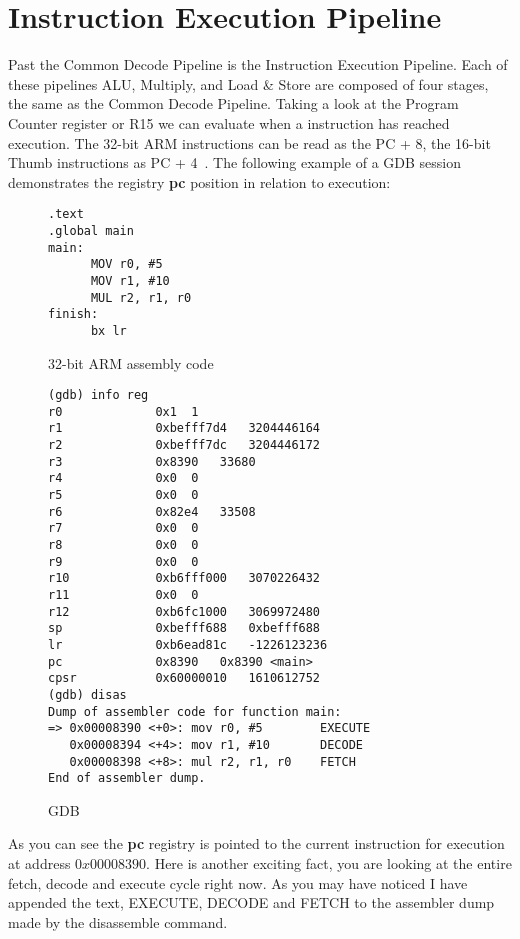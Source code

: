 \documentclass[11pt]{report}
\begin{document}
\section{Instruction Execution Pipeline }
\begin{onehalfspace}
Past the Common Decode Pipeline is the Instruction Execution Pipeline. Each of these pipelines ALU, Multiply, and Load \& Store are composed of four stages, the same as the Common Decode Pipeline. Taking a look at the Program Counter register or R15 we can evaluate when a instruction has reached execution. The 32-bit ARM instructions can be read as the PC + 8, the 16-bit Thumb instructions as PC + 4~\citep[A2-11]{arm7}. The following example of a GDB session demonstrates the registry \textbf{pc} position in relation to execution:
\end{onehalfspace}
\begin{figure}[H]
\begin{verbatim}
.text
.global main
main:
      MOV r0, #5
      MOV r1, #10
      MUL r2, r1, r0
finish:
      bx lr
\end{verbatim}
\caption{32-bit ARM assembly code}
\end{figure}
\begin{figure}[H]
\begin{verbatim}
(gdb) info reg
r0             0x1	1
r1             0xbefff7d4	3204446164
r2             0xbefff7dc	3204446172
r3             0x8390	33680
r4             0x0	0
r5             0x0	0
r6             0x82e4	33508
r7             0x0	0
r8             0x0	0
r9             0x0	0
r10            0xb6fff000	3070226432
r11            0x0	0
r12            0xb6fc1000	3069972480
sp             0xbefff688	0xbefff688
lr             0xb6ead81c	-1226123236
pc             0x8390	0x8390 <main>
cpsr           0x60000010	1610612752
(gdb) disas
Dump of assembler code for function main:
=> 0x00008390 <+0>:	mov	r0, #5        EXECUTE
   0x00008394 <+4>:	mov	r1, #10       DECODE
   0x00008398 <+8>:	mul	r2, r1, r0    FETCH
End of assembler dump.

\end{verbatim}
\caption{GDB}
\end{figure}
\begin{onehalfspace}
As you can see the \textbf{pc} registry is pointed to the current instruction for execution at address $0x00008390$. Here is another exciting fact, you are looking at the entire fetch, decode and execute cycle right now. As you may have noticed I have appended the text, EXECUTE, DECODE and FETCH to the assembler dump made by the disassemble command.  
\end{onehalfspace}
\end{document}
